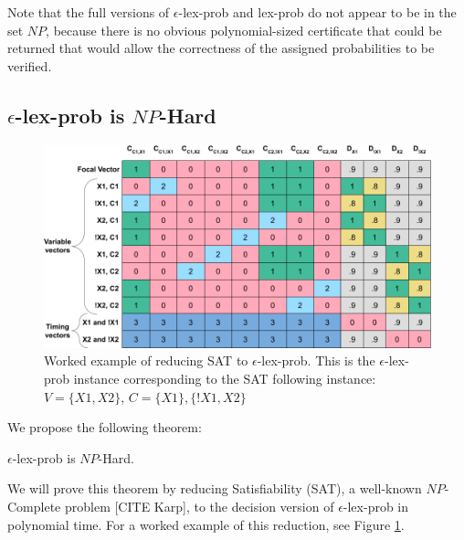\documentclass[sigconf]{acmart}
\begin{document}
Note that the full versions of {\sc $\epsilon$-lex-prob} and {\sc lex-prob} do not appear to be in the set $NP$, because there is no obvious polynomial-sized certificate that could be returned that would allow the correctness of the assigned probabilities to be verified. 

\subsection{{\sc $\epsilon$-lex-prob} is $NP$-Hard}

\begin{figure}
    \centering
    \includegraphics[width=\linewidth]{figs/SAT_to_eps_example.png}
    \caption{Worked example of reducing {\sc SAT} to {\sc $\epsilon$-lex-prob}. This is the {\sc $\epsilon$-lex-prob} instance corresponding to the {\sc SAT} following instance: $V = \{X1, X2\}$, $C = \{X1\}, \{!X1, X2\}$}
    \label{fig:sat_to_eps}
\end{figure}

We propose the following theorem:

\begin{theorem}
\label{elexicasetheorem}
{\sc $\epsilon$-lex-prob} is $NP$-Hard.
\end{theorem}

We will prove this theorem by reducing Satisfiability ({\sc SAT}), a well-known $NP$-Complete problem [CITE Karp], to the decision version of {\sc $\epsilon$-lex-prob} in polynomial time. For a worked example of this reduction, see Figure \ref{fig:sat_to_eps}.
\end{document}
